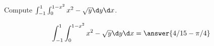 \documentclass{ximera}
\author{David Guichard \and Neal Koblitz \and H. Jerome Keisler \and Albert Scheller \and Barry Balof \and Mike Wills \and Matthew Carr}
\begin{document}
\begin{exercise}




Compute $\int_{-1}^{1}\int_{0}^{1-x^2}x^2-\sqrt{y} \d y\d x$.
\begin{prompt}
\[
\int_{-1}^{1}\int_{0}^{1-x^2}x^2-\sqrt{y} \d y\d x=\answer{4/15-\pi/4}
\]
\end{prompt}



\end{exercise}
\end{document}
